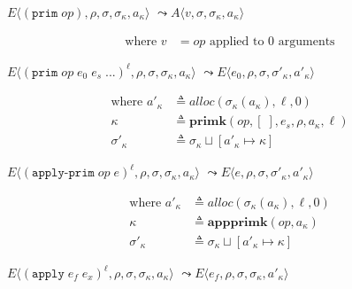 \documentclass[12pt,draft]{article}
\newcommand{\primsyn}[2]{(\texttt{prim}\;#1\;#2\;...)}
\newcommand{\singleprimsyn}[1]{(\texttt{prim}\;#1)}
\newcommand{\applyprimsyn}[2]{(\texttt{apply-prim}\;#1\;#2)}
\newcommand{\applysyn}[2]{(\texttt{apply}\;#1\;#2)}
\begin{document}
{\begin{multicols*}{2}
\begin{center}
  $E\langle \singleprimsyn{op} , \rho , \sigma , \sigma_\kappa , a_\kappa \rangle$
  $\leadsto A\langle v , \sigma , \sigma_\kappa , a_\kappa \rangle$
\end{center}
\vspace{-7mm}
\begin{align*}
\text{where } v &= op \text{ applied to } 0 \text{ arguments}
\end{align*}
\begin{center}
  $E\langle \primsyn{op}{e_0\;e_s}^\ell,\rho , \sigma,\sigma_\kappa,a_\kappa\rangle$
  $\leadsto E\langle e_0 , \rho , \sigma , \sigma'_\kappa , a'_\kappa \rangle$
\end{center}
\vspace{-7mm}
\begin{align*}
  \text{where }
  a'_\kappa &\triangleq alloc(\sigma_\kappa(a_\kappa), \ell, 0) \\
  \kappa &\triangleq \textbf{primk}(op, [\;], e_s, \rho, a_\kappa, \ell) \\
  \sigma'_\kappa &\triangleq \sigma_\kappa \sqcup [a'_\kappa \mapsto \kappa]
\end{align*}
\begin{center}
  $E\langle \applyprimsyn{op}{e}^\ell , \rho , \sigma , \sigma_\kappa,a_\kappa \rangle$
  $\leadsto E\langle e , \rho , \sigma , \sigma'_\kappa , a'_\kappa \rangle$
\end{center}
\vspace{-7mm}
\begin{align*}
  \text{where }
  a'_\kappa &\triangleq alloc(\sigma_\kappa(a_\kappa), \ell, 0) \\
  \kappa &\triangleq \textbf{appprimk}(op, a_\kappa) \\
  \sigma'_\kappa &\triangleq \sigma_\kappa \sqcup [a'_\kappa \mapsto \kappa]
\end{align*}
\begin{center}
  $E\langle \applysyn{e_f}{e_x}^\ell , \rho , \sigma , \sigma_\kappa,a_\kappa \rangle$
  $\leadsto E\langle e_f , \rho , \sigma , \sigma_\kappa , a'_\kappa \rangle$
\end{center}
\vspace{-7mm}
\begin{align*}

\end{align*}
\end{multicols*}}
\end{document}
